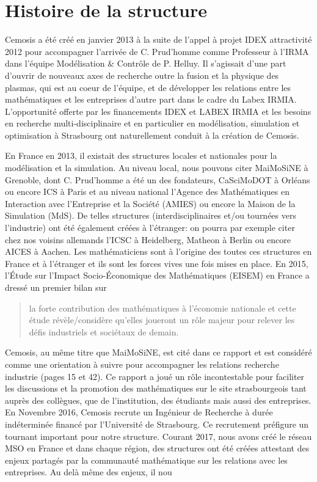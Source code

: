 \section*{Histoire de la structure}
	
Cemosis a été créé en janvier 2013 à la suite de l'appel à projet IDEX attractivité 2012 pour accompagner l'arrivée de C. Prud'homme comme Professeur à l'IRMA dans l'équipe Modélisation & Contrôle de P. Helluy. Il s'agissait d'une part d'ouvrir de nouveaux axes de recherche outre la fusion et la physique des plasmas, qui est au coeur de l'équipe, et de développer les relations entre les mathématiques et les entreprises d'autre part dans le cadre du Labex IRMIA. L'opportunité offerte par les financements IDEX et LABEX IRMIA et les besoins en recherche multi-disciplinaire et en particulier en modélisation, simulation et optimisation  à Strasbourg ont naturellement conduit à la création de Cemosis.

En France en 2013, il existait des structures locales et nationales pour la modélisation et la simulation. Au niveau local, nous pouvons citer MaiMoSiNE à Grenoble, dont C. Prud'homme a été un des fondateurs, CaSciMoDOT à Orléans ou encore ICS à Paris et au niveau national l'Agence des Mathématiques en Interaction avec l'Entreprise et la Société (AMIES) ou encore la Maison de la Simulation  (MdS). De telles structures (interdisciplinaires et/ou tournées vers l'industrie) ont été également créées à l'étranger: on pourra par exemple citer chez nos voisins allemands l'ICSC à Heidelberg, Matheon à Berlin ou encore AICES à Aachen.
Les mathématiciens sont à l'origine des toutes ces structures en France et à l'étranger et ils sont les forces vives une fois mises en place. 
En 2015, l'Étude sur l'Impact Socio-Économique des Mathématiques (EISEM) en France a dressé un premier bilan sur 
\begin{quote}la  forte contribution des mathématiques à l'économie nationale et cette étude révèle/considère qu'elles joueront un rôle majeur pour relever les défis industriels et sociétaux de demain.\end{quote}  
Cemosis, au même titre que MaiMoSiNE, est cité dans ce rapport et est considéré comme une orientation à suivre pour accompagner les relations recherche industrie (pages 15 et 42). 
Ce rapport a joué un rôle incontestable pour faciliter les discussions et la promotion des mathématiques sur le site strasbourgeois tant auprès des collègues, que de l'institution, des étudiants mais aussi des entreprises.
En Novembre 2016, Cemosis recrute un Ingénieur de Recherche à durée indéterminée financé par l'Université de Strasbourg. Ce recrutement préfigure un tournant important pour notre structure.
Courant 2017, nous avons créé le réseau MSO en France et dans chaque région, des structures ont été créées attestant des enjeux partagés par la communauté mathématique sur les relations avec les entreprises. Au delà même des enjeux, il nou

